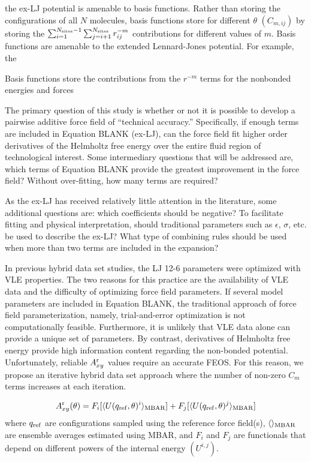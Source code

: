 \documentclass[11pt,a4paper]{article}
\begin{document}
the ex-LJ potential is amenable to basis functions. Rather than storing the configurations of all $N$ molecules, basis functions store  for different $\theta$ $(C_{m,ij})$ by storing the $\sum_{i=1}^{N_{\rm sites}-1} \sum_{j=i+1}^{N_{\rm sites}} r_{ij}^{-m}$ contributions for different values of $m$. Basis functions are amenable to the extended Lennard-Jones potential. For example, the 

Basis functions store the contributions from the $r^{-m}$ terms for the nonbonded energies and forces

The primary question of this study is whether or not it is possible to develop a pairwise additive force field of ``technical accuracy.'' Specifically, if enough terms are included in Equation BLANK (ex-LJ), can the force field fit higher order derivatives of the Helmholtz free energy over the entire fluid region of technological interest. Some intermediary questions that will be addressed are, which terms of Equation BLANK provide the greatest improvement in the force field? Without over-fitting, how many terms are required? 

As the ex-LJ has received relatively little attention in the literature, some additional questions are: which coefficients should be negative? To facilitate fitting and physical interpretation, should traditional parameters such as $\epsilon$, $\sigma$, etc. be used to describe the ex-LJ? What type of combining rules should be used when more than two terms are included in the expansion?

In previous hybrid data set studies, the LJ 12-6 parameters were optimized with VLE properties. The two reasons for this practice are the availability of VLE data and the difficulty of optimizing force field parameters. If several model parameters are included in Equation BLANK, the traditional approach of force field parameterization, namely, trial-and-error optimization is not computationally feasible. Furthermore, it is unlikely that VLE data alone can provide a unique set of parameters. By contrast, derivatives of Helmholtz free energy provide high information content regarding the non-bonded potential. Unfortunately, reliable $A_{xy}^{\rm r}$ values require an accurate FEOS. For this reason, we propose an iterative hybrid data set approach where the number of non-zero $C_m$ terms increases at each iteration.

\begin{equation}
A_{xy}^{\rm r}(\theta) = F_i[\langle U(q_{\rm ref},\theta)^i \rangle_{\rm MBAR}] + F_j[\langle U(q_{\rm ref},\theta)^j \rangle_{\rm MBAR}]
\end{equation}
where $q_{\rm ref}$ are configurations sampled using the reference force field(s), $\langle\rangle_{\rm MBAR}$ are ensemble averages estimated using MBAR, and $F_i$ and $F_j$ are functionals that depend on different powers of the internal energy $(U^{i,j})$. 
\end{document}
